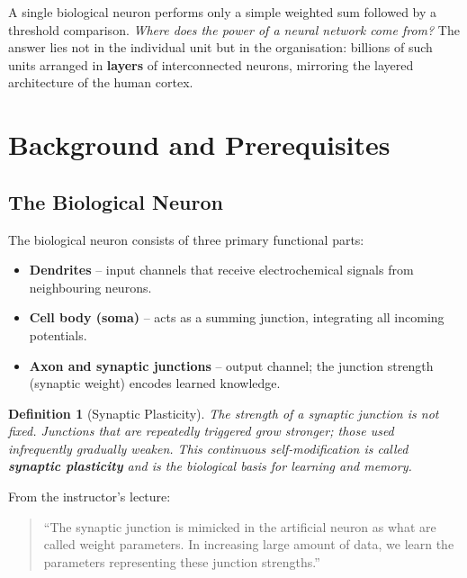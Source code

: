 \documentclass[12pt,a4paper]{article}
\newtheorem{definition}{Definition}[section]
\begin{document}
\begin{keyinsight}[title=The Key Question of This Session]
A single biological neuron performs only a simple weighted sum followed
by a threshold comparison.
\emph{Where does the power of a neural network come from?}
The answer lies not in the individual unit but in the organisation:
billions of such units arranged in \textbf{layers} of interconnected
neurons, mirroring the layered architecture of the human cortex.
\end{keyinsight}

\section{Background and Prerequisites}
\label{sec:background}

\subsection{The Biological Neuron}
\label{subsec:bio-neuron}

The biological neuron consists of three primary functional parts:
\begin{itemize}
  \item \textbf{Dendrites} -- input channels that receive electrochemical
        signals from neighbouring neurons.
  \item \textbf{Cell body (soma)} -- acts as a summing junction,
        integrating all incoming potentials.
  \item \textbf{Axon and synaptic junctions} -- output channel; the
        junction strength (synaptic weight) encodes learned knowledge.
\end{itemize}

\begin{definition}[Synaptic Plasticity]
\label{def:plasticity}
The strength of a synaptic junction is not fixed.
Junctions that are \emph{repeatedly triggered} grow stronger; those
used infrequently gradually weaken.
This continuous self-modification is called \textbf{synaptic plasticity}
and is the biological basis for learning and memory.
\end{definition}

From the instructor's lecture:
\begin{quote}
``The synaptic junction is mimicked in the artificial neuron as what
are called weight parameters. In increasing large amount of data,
we learn the parameters representing these junction strengths.''
\end{quote}
\end{document}

